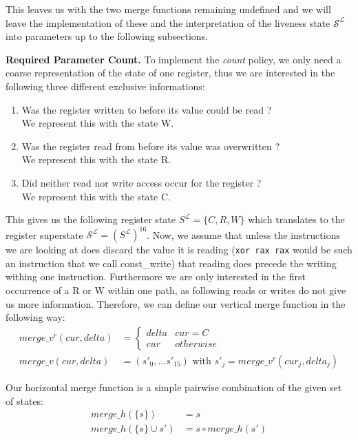 This leaves us with the two merge functions remaining undefined and we will leave the implementation of these and the interpretation of the 
liveness state $\mathcal{S}^\mathcal{L}$ into parameters up to the following subsections.

\textbf{Required Parameter Count.}
\label{subsection:requiredparamcount}
To implement the \emph{count} policy, we only need a coarse representation of the state of one register, thus we are interested in the 
following three different exclusive informations:
\begin{enumerate}
\item Was the register written to before its value could be read ? \\ We represent this with the state W.
\item Was the register read from before its value was overwritten ? \\ We represent this with the state R.
\item Did neither read nor write access occur for the register ? \\ We represent this with the state C.
\end{enumerate}
This gives us the following register state $S^\mathcal{L} = \{ C, R, W \}$ which translates to the register superstate $\mathcal{S}^\mathcal{L} = (S^\mathcal{L})^{16}$.
Now, we assume that unless the instructions we are looking at does discard the value it is reading (\texttt{xor rax rax} would be such an 
instruction that we call const\_write) that reading does precede the writing withing one instruction. Furthermore we are only interested 
in the first occurrence of a R or W within one path, as following reads or writes do not give us more information.
Therefore, we can define our vertical merge function in the following way:
\begin{align}
merge\_v^{r} (cur, delta) &= \left\{
  \begin{array}{lr}
     delta & cur = C \\
     cur & otherwise
  \end{array}
\right. \\
merge\_v (cur, delta) &= (s'_0, ... s'_15) \text { with } s'_j = merge\_v^{r}(cur_j, delta_j)
\end{align}


Our horizontal merge function is a simple pairwise combination of the given set of states:
\begin{align}
merge\_h(\{s\}) &= s\\
merge\_h(\{s\} \cup s') &= s \circ merge\_h(s')
\end{align}

